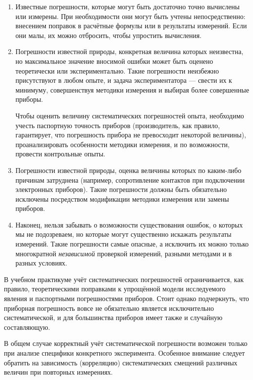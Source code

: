 \begin{enumerate}
    \item Известные погрешности, которые могут быть достаточно точно вычислены
или измерены. При необходимости они могут быть учтены непосредственно:
внесением поправок в расчётные формулы или в результаты измерений.
Если они малы, их можно отбросить, чтобы упростить вычисления.

    \item Погрешности известной природы, конкретная величина которых неизвестна,
но максимальное значение вносимой ошибки может быть оценено теоретически
или экспериментально. Такие погрешности неизбежно присутствуют в любом
опыте, и задача экспериментатора --- свести их к минимуму,
совершенствуя методики измерения и выбирая более совершенные приборы.

    Чтобы оценить величину систематических погрешностей опыта, необходимо
учесть паспортную точность приборов (производитель, как правило, гарантирует,
что погрешность прибора не превосходит некоторой величины), проанализировать
особенности методики измерения, и по возможности, провести контрольные
опыты.

    \item Погрешности известной природы, оценка величины которых по каким-либо
причинам затруднена (например, сопротивление контактов при подключении
электронных приборов). Такие погрешности должны быть обязательно исключены
посредством модификации методики измерения или замены приборов.

    \item Наконец, нельзя забывать о возможности существования ошибок, о
которых мы не подозреваем, но которые могут существенно искажать результаты
измерений. Такие погрешности самые опасные, а исключить их можно только
многократной \emph{независимой} проверкой измерений, разными методами
и в разных условиях.
\end{enumerate}

В учебном практикуме учёт систематических погрешностей ограничивается,
как правило, теоретическими поправками
к упрощённой модели исследуемого явления и паспортными погрешностями приборов.
Стоит однако подчеркнуть, что приборная погрешность вовсе не обязательно является исключительно систематической, и для большинства приборов имеет также и случайную составляющую.

В общем случае корректный учёт систематической погрешности возможен только при анализе специфики конкретного эксперимента. Особенное внимание следует обратить на зависимость (корреляцию) систематических смещений различных величин 
при повторных измерениях. 

